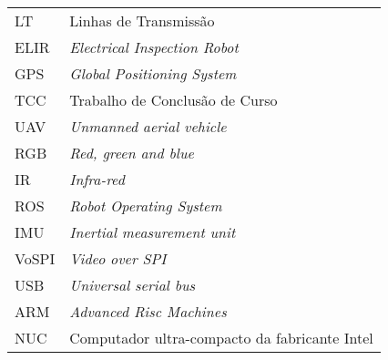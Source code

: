 \begin{thesisabbreviations}
\begin{footnotesize}
\begin{longtable}[l]{p{2cm}l}
  LT   \dotfill & Linhas de Transmissão \\
  ELIR \dotfill &  \textit{Electrical Inspection Robot} \\
  GPS  \dotfill & \textit{Global Positioning System} \\
  TCC  \dotfill & Trabalho de Conclusão de Curso \\
  UAV  \dotfill & \textit{Unmanned aerial vehicle} \\
  RGB  \dotfill & \textit{Red, green and blue} \\
  IR   \dotfill & \textit{Infra-red} \\
  ROS  \dotfill & \textit{Robot Operating System} \\
  IMU  \dotfill & \textit{Inertial measurement unit} \\
  VoSPI \dotfill & \textit{Video over SPI}\\
  USB \dotfill & \textit{Universal serial bus}\\
  ARM \dotfill & \textit{Advanced Risc Machines}\\
  NUC \dotfill & Computador ultra-compacto da fabricante Intel
  
\end{longtable}
\end{footnotesize}
\end{thesisabbreviations}

